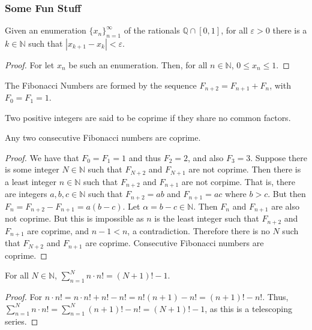         \subsubsection{Some Fun Stuff}
        \begin{theorem}
        Given an enumeration $\{x_n\}_{n=1}^{\infty}$ of the rationals $\mathbb{Q}\cap [0,1]$, for all $\varepsilon>0$ there is a $k\in \mathbb{N}$ such that $|x_{k+1}-x_k|<\varepsilon$.
        \end{theorem}
        \begin{proof}
        For let $x_n$ be such an enumeration. Then, for all $n\in \mathbb{N}$, $0 \leq x_n \leq 1$.
        \end{proof}
        \begin{definition}
        The Fibonacci Numbers are formed by the sequence $F_{n+2}=F_{n+1}+F_{n}$, with $F_0=F_1 = 1$.
        \end{definition}
        \begin{definition}
        Two positive integers are said to be coprime if they share no common factors.
        \end{definition}
        \begin{theorem}
        Any two consecutive Fibonacci numbers are coprime.
        \end{theorem}
        \begin{proof}
        We have that $F_0=F_1 = 1$ and thus $F_2 = 2$, and also $F_3 = 3$. Suppose there is some integer $N\in \mathbb{N}$ such that $F_{N+2}$ and $F_{N+1}$ are not coprime. Then there is a least integer $n\in \mathbb{N}$ such that $F_{n+2}$ and $F_{n+1}$ are not corpime. That is, there are integers $a,b,c\in \mathbb{N}$ such that $F_{n+2} = ab$ and $F_{n+1} = ac$ where $b>c$. But then $F_{n} = F_{n+2} - F_{n+1} = a(b-c)$. Let $\alpha = b-c \in \mathbb{N}$. Then $F_n$ and $F_{n+1}$ are also not coprime. But this is impossible as $n$ is the least integer such that $F_{n+2}$ and $F_{n+1}$ are coprime, and $n-1<n$, a contradiction. Therefore there is no $N$ such that $F_{N+2}$ and $F_{n+1}$ are coprime. Consecutive Fibonacci numbers are coprime. 
        \end{proof}
        \begin{theorem}
        For all $N\in \mathbb{N}$, $\sum_{n=1}^{N} n\cdot n! = (N+1)!-1$.
        \end{theorem}
        \begin{proof}
        For $n\cdot n! = n\cdot n! + n! - n! = n!(n+1) - n!=(n+1)!-n!$. Thus, $\sum_{n=1}^{N} n\cdot n! = \sum_{n=1}^{N} (n+1)! -n! = (N+1)!-1$, as this is a telescoping series.
        \end{proof}
